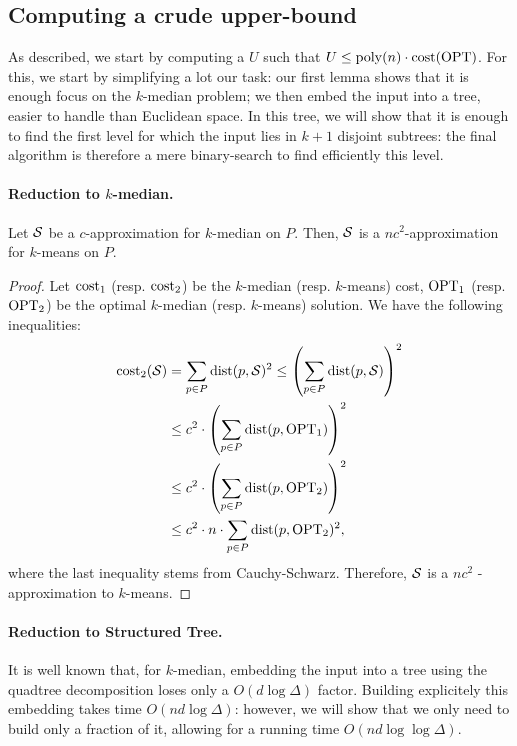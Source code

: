 \subsection{Computing a crude upper-bound}
As described, we start by computing a $U$ such that $U \leq \operatorname{poly}(n) \cdot \operatorname{cost}(\text{OPT})$. For this, we start by simplifying a lot our task: our first lemma shows that it is enough focus on the $k$-median problem; we then embed the input into a tree, easier to handle than Euclidean space. In this tree, we will show that it is enough to find the first level for which the input lies in $k+1$ disjoint subtrees: the final algorithm is therefore a mere binary-search to find efficiently this level.

\paragraph{Reduction to $k$-median.}

\begin{lemma}
Let $\mathcal S$ be a $c$-approximation for $k$-median on $P$. Then, $\mathcal S$ is a $nc^2$-approximation for $k$-means on $P$.
\end{lemma}
\begin{proof}
Let $\operatorname{cost}_1$ (resp. $\operatorname{cost}_2$) be the $k$-median (resp. $k$-means) cost, $\text{OPT}_1$ (resp. $\text{OPT}_2$) be the optimal $k$-median (resp. $k$-means) solution. We have the following inequalities:
\begin{align*}
\operatorname{cost}_2(\mathcal S) &= \sum_{p\in P} \operatorname{dist}(p, \mathcal S)^2 \leq \left( \sum_{p\in P} \operatorname{dist}(p, \mathcal S)\right)^2\\
&\leq c^2 \cdot \left(  \sum_{p\in P} \operatorname{dist}(p, \text{OPT}_1)\right)^2\\
&\leq c^2 \cdot \left(  \sum_{p\in P} \operatorname{dist}(p, \text{OPT}_2)\right)^2\\
&\leq c^2 \cdot n \cdot  \sum_{p\in P} \operatorname{dist}(p, \text{OPT}_2)^2,
\end{align*}
where the last inequality stems from Cauchy-Schwarz. Therefore, $\mathcal S$ is a $nc^2$ - approximation to $k$-means. 
\end{proof}

\paragraph{Reduction to Structured Tree.}
\newcommand{\boxsize}{\textsc{MaxDist}}
It is well known that, for $k$-median, embedding the input into a tree using the quadtree decomposition loses only a $O(d \log \Delta)$ factor. Building explicitely this embedding takes time $O(nd \log \Delta)$: however, we will show that we only need to build only a fraction of it, allowing for a running time $O(nd \log \log \Delta)$. 

